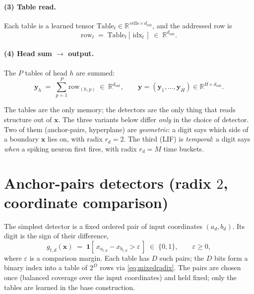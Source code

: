 \documentclass[11pt]{article}
\newcommand{\R}{\mathbb{R}}
\newcommand{\x}{\mathbf{x}}
\newcommand{\ind}[1]{\mathbf{1}\!\left[#1\right]}
\begin{document}
\paragraph{(3) Table read.} Each table is a learned tensor $\mathrm{Table}_t \in \R^{\,\text{cells}\times
d_{\mathrm{out}}}$, and the addressed row is
\begin{equation}
  \mathrm{row}_t \;=\; \mathrm{Table}_t[\,\mathrm{idx}_t\,] \;\in\; \R^{d_{\mathrm{out}}}.
\end{equation}

\paragraph{(4) Head sum $\rightarrow$ output.} The $P$ tables of head $h$ are summed:
\begin{equation}
  \mathbf{y}_h \;=\; \sum_{p=1}^{P} \mathrm{row}_{(h,p)} \;\in\; \R^{d_{\mathrm{out}}},
  \qquad
  \mathbf{y} = (\mathbf{y}_1, \dots, \mathbf{y}_H) \in \R^{H \times d_{\mathrm{out}}}.
\end{equation}

The tables are the only memory; the detectors are the only thing that reads structure out of $\x$. The three
variants below differ \emph{only} in the choice of detector. Two of them (anchor-pairs, hyperplane) are
\emph{geometric}: a digit says which side of a boundary $\x$ lies on, with radix $r_d = 2$. The third (LIF) is
\emph{temporal}: a digit says \emph{when} a spiking neuron first fires, with radix $r_d = M$ time buckets.

\section{Anchor-pairs detectors (radix $2$, coordinate comparison)}
\label{sec:anchor}

The simplest detector is a fixed ordered pair of input coordinates $(a_d, b_d)$. Its digit is the sign of
their difference,
\begin{equation}
  g_{t,d}(\x) \;=\; \ind{\, x_{a_{t,d}} - x_{b_{t,d}} > \varepsilon \,} \;\in\; \{0,1\},
  \qquad \varepsilon \ge 0,
  \label{eq:anchor}
\end{equation}
where $\varepsilon$ is a comparison margin. Each table has $D$ such pairs; the $D$ bits form a binary index
into a table of $2^{D}$ rows via \eqref{eq:mixedradix}. The pairs are chosen once (balanced coverage over the
input coordinates) and held fixed; only the tables are learned in the base construction.
\end{document}
